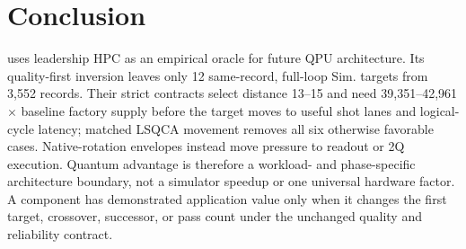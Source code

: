 \section{Conclusion}

\SystemName uses leadership HPC as an empirical oracle for future QPU architecture. Its quality-first inversion leaves only 12 same-record, full-loop Sim. targets from 3,552 records. Their strict contracts select distance 13--15 and need 39,351--42,961$\times$ baseline factory supply before the target moves to useful shot lanes and logical-cycle latency; matched LSQCA movement removes all six otherwise favorable cases. Native-rotation envelopes instead move pressure to readout or 2Q execution. Quantum advantage is therefore a workload- and phase-specific architecture boundary, not a simulator speedup or one universal hardware factor. A component has demonstrated application value only when it changes the first target, crossover, successor, or pass count under the unchanged quality and reliability contract.
